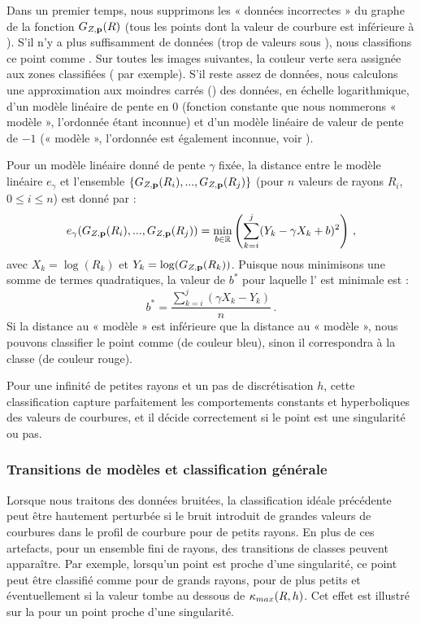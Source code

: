 Dans un premier temps, nous supprimons les « données incorrectes » du graphe de
la fonction $G_{Z,\mathbf{p}}(R)$ (\cad tous les points dont la valeur de courbure est
inférieure à \CurvMax). S'il n'y a plus suffisamment de données (trop de valeurs
sous \CurvMax), nous classifions ce point comme \featflat. Sur toutes les images
suivantes, la couleur verte sera assignée aux zones classifiées \featflat
( par exemple). S'il reste assez de données, nous
calculons une approximation aux moindres carrés ()
des données, en échelle logarithmique, d'un modèle linéaire de pente en $0$
(fonction constante que nous nommerons « modèle \featsmooth », l'ordonnée étant
inconnue) et d'un modèle linéaire de valeur de pente de $-1$ (« modèle \featedge »,
l'ordonnée est également inconnue, voir
).


Pour un modèle linéaire donné de pente $\gamma$ fixée, la distance entre le modèle
linéaire $e_\gamma$ et l'ensemble $\{G_{Z,\mathbf{p}}(R_i), ..., G_{Z,\mathbf{p}}(R_j)\}$ (pour
$n$ valeurs de rayons $R_i$, $0 \leq i \leq n$) est donné par :
%
\begin{equation}
  \label{eq:distance-modele-lineaire}
  e_\gamma(G_{Z,\mathbf{p}}(R_i), ..., G_{Z,\mathbf{p}}(R_j))= \min_{b\in \mathbb{R}}
  \left ( \sum_{k=i}^j (Y_k - \gamma X_k + b)^2\right)\,,
\end{equation}
%
avec $X_k=\log (R_k)$ et $Y_k=\log(G_{Z,\mathbf{p}}(R_k))$. Puisque nous minimisons une
somme de termes quadratiques, la valeur de $b^*$ pour laquelle
l' est minimale est :
%
\begin{equation}
  b^* = \frac{\sum_{k=i}^j ( \gamma X_k - Y_k)}{n}\,.
\end{equation}
%
Si la distance au « modèle \featsmooth » est inférieure que la distance au «
modèle \featedge », nous pouvons classifier le point comme \featsmooth (de
couleur bleu), sinon il correspondra à la classe \featedge (de couleur rouge).


Pour une infinité de petites rayons et un pas de discrétisation $h$, cette
classification capture parfaitement les comportements constants et hyperboliques
des valeurs de courbures, et il décide correctement si le point est une
singularité ou pas.
%
\subsubsection{Transitions de modèles et classification générale}%
\label{sec:applications:feature:II:transitions}
%
Lorsque nous traitons des données bruitées, la classification idéale précédente
peut être hautement perturbée si le bruit introduit de grandes valeurs de
courbures dans le profil de courbure pour de petits rayons. En plus de ces
artefacts, pour un ensemble fini de rayons, des transitions de classes peuvent
apparaître. Par exemple, lorsqu'un point est proche d'une singularité, ce point
peut être classifié comme \featedge pour de grands rayons, \featsmooth pour de
plus petits et éventuellement \featflat si la valeur tombe au dessous de
$\kappa_{max}(R,h)$. Cet effet est illustré sur la  pour un
point proche d'une singularité.

